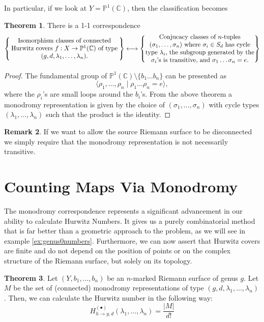 \documentclass[12pt,a4paper,openright,twoside]{report}
\theoremstyle{definition} %
\newtheorem{theorem}{Theorem}[chapter]
\newtheorem{remark}[theorem]{Remark}
\def \C {\mathbb{C}}
\def \PP {\mathbb{P}^1(\C)}
\begin{document}
In particular, if we look at \(Y = \PP\), then the classification becomes

\begin{theorem}\label{th:monp1}
    There is a 1-1 correspondence
    \[     
     \left\{
        \parbox{6cm}{\centering Isomorphism classes of connected Hurwitz covers \(f : X \to \PP\) of type \((g,d,\lambda_1, \ldots, \lambda_n)\).}
     \right\}
     \longleftrightarrow
     \left\{
        \parbox{6cm}{\centering Conjucacy classes of \(n\)-tuples \((\sigma_1, \ldots, \sigma_n)\) where \( \sigma_i \in S_d\) has cycle type \(\lambda_i\), the subgroup generated by the \(\sigma_i\)'s is transitive, and \(\sigma_1 \ldots \sigma_n = e\).}
     \right\}
    \] 
\end{theorem}


\begin{proof}
    The fundamental group of \(\PP \setminus \{b_1 \ldots b_n\}\) can be presented as
    \[
    \langle \rho_1, \ldots, \rho_n \mid \rho_1 \ldots \rho_n = e \rangle,
    \]
    where the \(\rho_i\)'s are small loops around the \(b_i\)'s.
    From the above theorem a monodromy representation is given by the choice of \((\sigma_1, \ldots, \sigma_n)\) with cycle types \((\lambda_1, \ldots, \lambda_n)\) such that the product is the identity.
\end{proof}

\begin{remark}
    If we want to allow the source Riemann surface to be disconnected we simply require that the monodromy representation is not necessarily transitive.
\end{remark}

\section{Counting Maps Via Monodromy}\label{sec:countingmonodromy}
The monodromy correspondence represents a significant advancement in our ability to calculate Hurwitz Numbers. It gives us a purely combinatorial method that is far better than a geometric approach to the problem, as we will see in example \ref{ex:genus0numbers}. Furthermore, we can now assert that Hurwitz covers are finite and do not depend on the position of points or on the complex structure of the Riemann surface, but solely on its topology.

\begin{theorem}
    Let \((Y, b_1, \ldots, b_n)\) be an \(n\)-marked Riemann surface of genus \(g\). Let \(M\) be the set of (connected) monodromy representations of type \((g,d,\lambda_1, \ldots, \lambda_n)\). Then, we can calculate the Hurwitz number in the following way:
    \[
    H_{h \to g,d}^{(\bullet)}(\lambda_1, \ldots, \lambda_n) = \frac{|M|}{d!}
    \]
\end{theorem}
\end{document}
